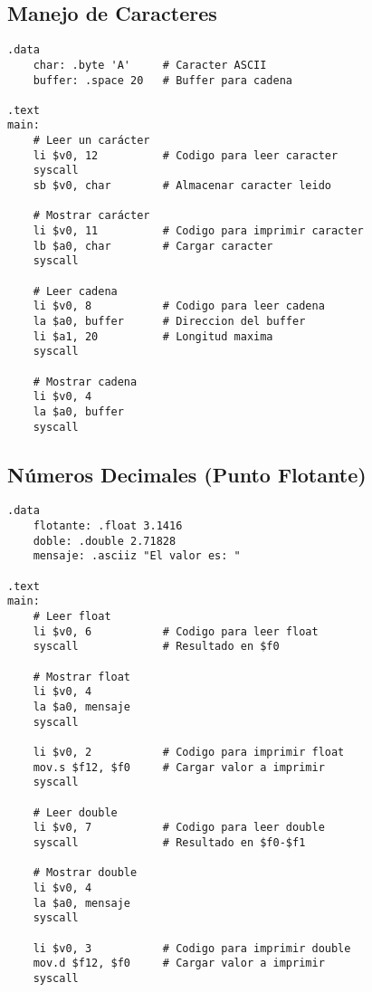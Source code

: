\documentclass{article}
\begin{document}
\subsection{Manejo de Caracteres}
\begin{lstlisting}[language={[mips]Assembler}]
.data
    char: .byte 'A'     # Caracter ASCII
    buffer: .space 20   # Buffer para cadena

.text
main:
    # Leer un carácter
    li $v0, 12          # Codigo para leer caracter
    syscall
    sb $v0, char        # Almacenar caracter leido

    # Mostrar carácter
    li $v0, 11          # Codigo para imprimir caracter
    lb $a0, char        # Cargar caracter
    syscall

    # Leer cadena
    li $v0, 8           # Codigo para leer cadena
    la $a0, buffer      # Direccion del buffer
    li $a1, 20          # Longitud maxima
    syscall

    # Mostrar cadena
    li $v0, 4
    la $a0, buffer
    syscall
\end{lstlisting}

\subsection{Números Decimales (Punto Flotante)}
\begin{lstlisting}[language={[mips]Assembler}]
.data
    flotante: .float 3.1416
    doble: .double 2.71828
    mensaje: .asciiz "El valor es: "

.text
main:
    # Leer float
    li $v0, 6           # Codigo para leer float
    syscall             # Resultado en $f0

    # Mostrar float
    li $v0, 4
    la $a0, mensaje
    syscall

    li $v0, 2           # Codigo para imprimir float
    mov.s $f12, $f0     # Cargar valor a imprimir
    syscall

    # Leer double
    li $v0, 7           # Codigo para leer double
    syscall             # Resultado en $f0-$f1

    # Mostrar double
    li $v0, 4
    la $a0, mensaje
    syscall

    li $v0, 3           # Codigo para imprimir double
    mov.d $f12, $f0     # Cargar valor a imprimir
    syscall
\end{lstlisting}
\end{document}
